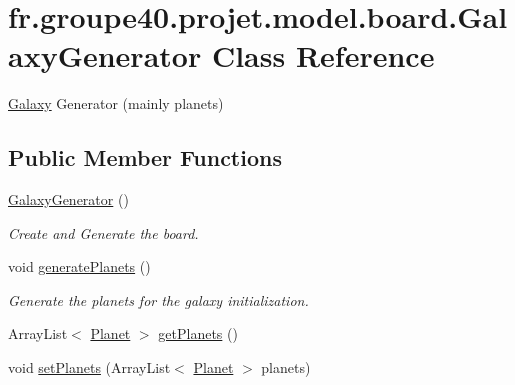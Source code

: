 \hypertarget{classfr_1_1groupe40_1_1projet_1_1model_1_1board_1_1_galaxy_generator}{}\section{fr.\+groupe40.\+projet.\+model.\+board.\+Galaxy\+Generator Class Reference}
\label{classfr_1_1groupe40_1_1projet_1_1model_1_1board_1_1_galaxy_generator}


\hyperlink{classfr_1_1groupe40_1_1projet_1_1model_1_1board_1_1_galaxy}{Galaxy} Generator (mainly planets)  


\subsection*{Public Member Functions}
\begin{DoxyCompactItemize}
\item 
\mbox{\label{classfr_1_1groupe40_1_1projet_1_1model_1_1board_1_1_galaxy_generator_a62a02f35dfdfb9a754d4138c1ac26a50}} 
\hyperlink{classfr_1_1groupe40_1_1projet_1_1model_1_1board_1_1_galaxy_generator_a62a02f35dfdfb9a754d4138c1ac26a50}{Galaxy\+Generator} ()
\begin{DoxyCompactList}\small\item\em Create and Generate the board. \end{DoxyCompactList}\item 
\mbox{\label{classfr_1_1groupe40_1_1projet_1_1model_1_1board_1_1_galaxy_generator_a7af2998c5098fa02bf6dfd0c794dfe2d}} 
void \hyperlink{classfr_1_1groupe40_1_1projet_1_1model_1_1board_1_1_galaxy_generator_a7af2998c5098fa02bf6dfd0c794dfe2d}{generate\+Planets} ()
\begin{DoxyCompactList}\small\item\em Generate the planets for the galaxy initialization. \end{DoxyCompactList}\item 
Array\+List$<$ \hyperlink{classfr_1_1groupe40_1_1projet_1_1model_1_1planets_1_1_planet}{Planet} $>$ \hyperlink{classfr_1_1groupe40_1_1projet_1_1model_1_1board_1_1_galaxy_generator_a025a232f305b1465f38a73fac918dbb5}{get\+Planets} ()
\item 
void \hyperlink{classfr_1_1groupe40_1_1projet_1_1model_1_1board_1_1_galaxy_generator_a67bac9f8bd2561972535ec64c63340ce}{set\+Planets} (Array\+List$<$ \hyperlink{classfr_1_1groupe40_1_1projet_1_1model_1_1planets_1_1_planet}{Planet} $>$ planets)
\end{DoxyCompactItemize}


